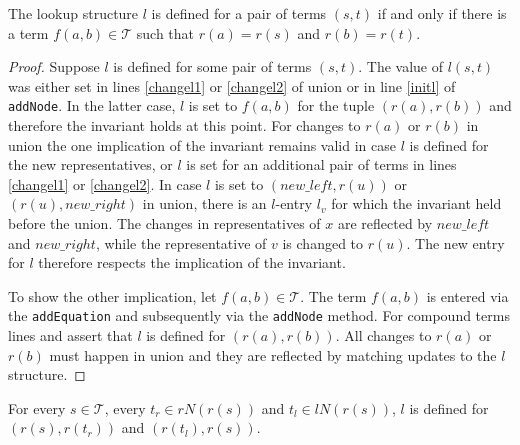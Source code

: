 \begin{invariant}[Lookup]

The lookup structure $l$ is defined for a pair of terms $(s,t)$ if and only if there is a term $f(a,b) \in \mathcal{T}$ such that $r(a) = r(s)$ and $r(b) = r(t)$.
\end{invariant}

\begin{proof}

Suppose $l$ is defined for some pair of terms $(s,t)$.
The value of $l(s,t)$ was either set in lines \ref{changel1} or \ref{changel2} of union or in line \ref{initl} of \texttt{addNode}.
In the latter case, $l$ is set to $f(a,b)$ for the tuple $(r(a),r(b))$ and therefore the invariant holds at this point.
For changes to $r(a)$ or $r(b)$ in union the one implication of the invariant remains valid in case $l$ is defined for the new representatives, or $l$ is set for an additional pair of terms in lines \ref{changel1} or \ref{changel2}.
In case $l$ is set to $(new\_left,r(u))$ or $(r(u),new\_right)$ in union, there is an $l$-entry $l_v$ for which the invariant held before the union.
The changes in representatives of $x$ are reflected by $new\_left$ and $new\_right$, while the representative of $v$ is changed to $r(u)$.
The new entry for $l$ therefore respects the implication of the invariant.

To show the other implication, let $f(a,b) \in \mathcal{T}$.
The term $f(a,b)$ is entered via the \texttt{addEquation} and subsequently via the \texttt{addNode} method.
For compound terms lines  and  assert that $l$ is defined for $(r(a),r(b))$.
All changes to $r(a)$ or $r(b)$ must happen in union and they are reflected by matching updates to the $l$ structure.

\end{proof}


\begin{invariant}[Neighbours]

For every $s \in \mathcal{T}$, every $t_r \in rN(r(s))$ and $t_l \in lN(r(s))$, $l$ is defined for $(r(s),r(t_r))$ and $(r(t_l),r(s))$.

\end{invariant}

